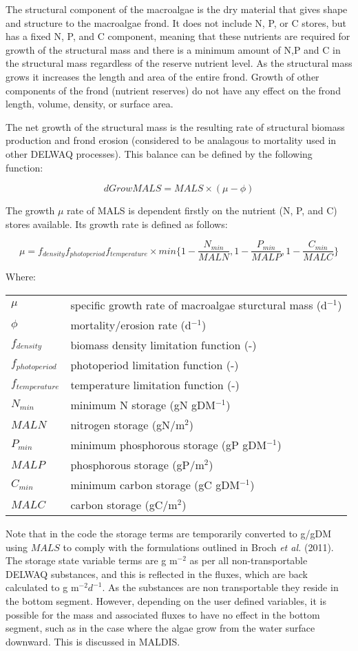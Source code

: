 \documentclass{deltares_manual}
\begin{document}
The structural component of the macroalgae is the dry material that gives shape and structure to the macroalgae frond. It does not include N, P, or C stores, but has a fixed N, P, and C component, meaning that these nutrients are required for growth of the structural mass and there is a minimum amount of N,P and C in the structural mass regardless of the reserve nutrient level. As the structural mass grows it increases the length and area of the entire frond. Growth of other components of the frond (nutrient reserves) do not have any effect on the frond length, volume, density, or surface area. 

The net growth of the structural mass is the resulting rate of structural biomass production and frond erosion (considered to be analagous to mortality used in other DELWAQ processes). This balance can be defined by the following function:

\[dGrowMALS =MALS \times (\mu - \phi)\]

The growth $\mu$ rate of MALS is dependent firstly on the nutrient (N, P, and C) stores available. Its growth rate is defined as follows:

\[\mu = f_{density} f_{photoperiod} f_{temperature}\times min\big\{1-\frac{N_{min}}{MALN},1-\frac{P_{min}}{MALP},1-\frac{C_{min}}{MALC}\big\}\]

Where:\\
\begin{tabular}{ll}
$\mu$  & specific growth rate of macroalgae sturctural mass (d$^{-1}$) \\
$\phi$ & mortality/erosion rate (d$^{-1}$) \\
$f_{density}$ & biomass density limitation function (-)\\
$f_{photoperiod}$ & photoperiod limitation function (-)\\
$f_{temperature}$ & temperature limitation function (-)\\
$N_{min}$ & minimum N storage (gN gDM$^{-1}$)\\
$MALN$ & nitrogen storage (gN/m$^2$)\\
$P_{min}$ & minimum phosphorous storage (gP gDM$^{-1}$)\\
$MALP$ & phosphorous storage (gP/m$^2$)\\
$C_{min}$ & minimum carbon storage (gC gDM$^{-1}$)\\
$MALC$ & carbon storage (gC/m$^2$)\\
\end{tabular}

Note that in the code the storage terms are temporarily converted to g/gDM using $MALS$ to comply with the formulations outlined in Broch \textit{et al.} (2011). The storage state variable terms are g m$^{-2}$ as per all non-transportable DELWAQ substances, and this is reflected in the fluxes, which are back calculated to g m$^{-2}d^{-1}$. As the substances are non transportable they reside in the bottom segment. However, depending on the user defined variables, it is possible for the mass and associated fluxes to have no effect in the bottom segment, such as in the case where the algae grow from the water surface downward. This is discussed in MALDIS.
\end{document}
